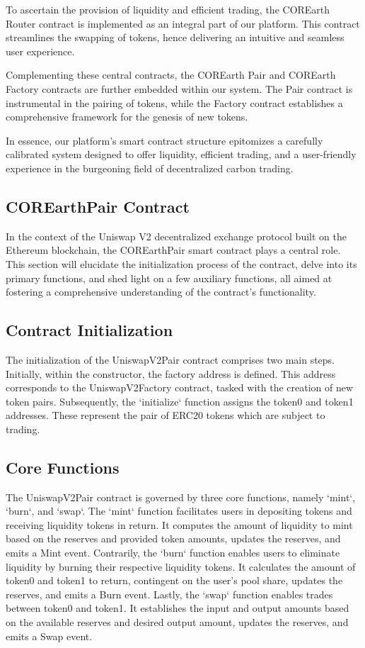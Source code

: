 \documentclass[sigconf, authordraft]{acmart}
\begin{document}
	To ascertain the provision of liquidity and efficient trading, the COREarth
	Router contract is implemented as an integral part of our platform. This contract
	streamlines the swapping of tokens, hence delivering an intuitive and seamless
	user experience.

	Complementing these central contracts, the COREarth Pair and COREarth Factory contracts
	are further embedded within our system. The Pair contract is instrumental in
	the pairing of tokens, while the Factory contract establishes a comprehensive framework
	for the genesis of new tokens.

	In essence, our platform's smart contract structure epitomizes a carefully
	calibrated system designed to offer liquidity, efficient trading, and a user-friendly
	experience in the burgeoning field of decentralized carbon trading.

	\subsection{COREarthPair Contract}


	In the context of the Uniswap V2 decentralized exchange protocol built on the
	Ethereum blockchain, the COREarthPair smart contract plays a central role.
	This section will elucidate the initialization process of the contract, delve into
	its primary functions, and shed light on a few auxiliary functions, all aimed at
	fostering a comprehensive understanding of the contract's functionality.

	\subsection{Contract Initialization}


	The initialization of the UniswapV2Pair contract comprises two main steps.
	Initially, within the constructor, the factory address is defined. This address
	corresponds to the UniswapV2Factory contract, tasked with the creation of new
	token pairs. Subsequently, the `initialize` function assigns the token0 and
	token1 addresses. These represent the pair of ERC20 tokens which are subject to
	trading.

	\subsection{Core Functions}


	The UniswapV2Pair contract is governed by three core functions, namely `mint`,
	`burn`, and `swap`. The `mint` function facilitates users in depositing tokens
	and receiving liquidity tokens in return. It computes the amount of liquidity
	to mint based on the reserves and provided token amounts, updates the reserves,
	and emits a Mint event. Contrarily, the `burn` function enables users to
	eliminate liquidity by burning their respective liquidity tokens. It calculates
	the amount of token0 and token1 to return, contingent on the user's pool share,
	updates the reserves, and emits a Burn event. Lastly, the `swap` function
	enables trades between token0 and token1. It establishes the input and output amounts
	based on the available reserves and desired output amount, updates the
	reserves, and emits a Swap event.
\end{document}
